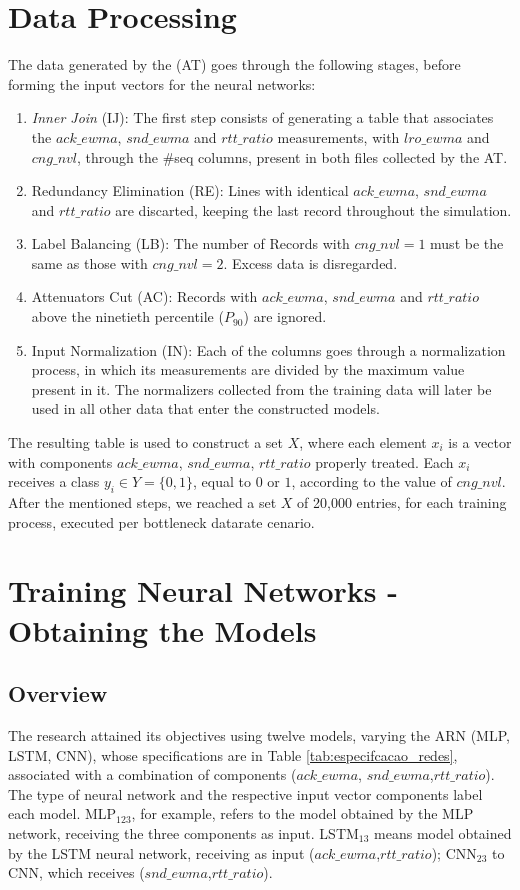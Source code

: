 \documentclass[a4paper,fleqn]{cas-sc}
\begin{document}
\section{Data Processing}
\label{sec:dataProcessing}
The data generated by the (AT) goes through the following stages, before forming the input vectors for the neural networks:
\begin{enumerate}
	\item \textit{Inner Join} (IJ): The first step consists of generating a table that associates the  $ack\_ewma$, $snd\_ewma$ and $rtt\_ratio$ measurements, with $lro\_ewma$ and $ cng\_nvl$, through the \#seq columns, present in  both files collected by the AT.
	\item Redundancy Elimination (RE): Lines with identical $ack\_ewma$, $snd\_ewma$ and $rtt\_ratio$ are discarted, keeping the last record throughout the simulation.
	\item Label Balancing (LB): The number of Records with  $cng\_nvl=1$ must be the same as those with  $cng\_nvl=2$. Excess data is disregarded.
	\item Attenuators Cut (AC): Records with $ack\_ewma$, $snd\_ewma$ and $rtt\_ratio$ above the ninetieth percentile ($P_{90}$) are ignored.
	\item Input Normalization (IN): Each of the columns goes through a normalization process, in which its measurements are divided by the maximum value present in it. The normalizers collected from the training data will later be used in all other data that enter the constructed models.
	\end {enumerate}
	The resulting table is used to construct a set $X$, where each element $x_i$ is a vector with components $ack\_ewma$, $snd\_ewma$, $rtt\_ratio$ properly treated. Each $x_i$ receives a class $y_i \in Y=\{0,1\}$, equal to $0$ or $1$, according to the value of $cng\_nvl$. After the mentioned steps, we reached a set $X$ of 20,000 entries, for each training process, executed per bottleneck datarate cenario.


\section{Training Neural Networks - Obtaining the Models}
\subsection{Overview}
The research attained its objectives using twelve models, varying the ARN (MLP, LSTM, CNN), whose specifications are in Table \ref{tab:especifcacao_redes}, associated with a combination of components ($ack\_ewma$, $snd\_ewma$,$rtt\_ratio$). The type of neural network and the respective input vector components label each model. MLP$_{123}$, for example, refers to the model obtained by the MLP network, receiving the three components as input. LSTM$_{13}$ means model obtained by the LSTM neural network, receiving as input ($ack\_ewma$,$rtt\_ratio$); CNN$_{23}$ to CNN, which receives ($snd\_ewma$,$rtt\_ratio$).
\end{document}
